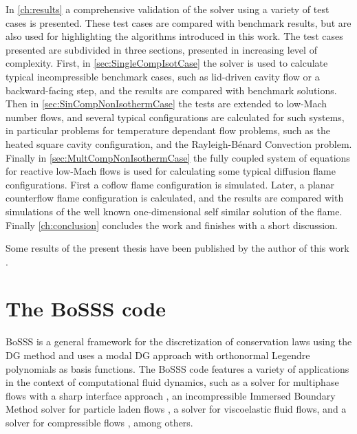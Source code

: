In \cref{ch:results} a comprehensive validation of the solver using a variety of test cases is presented. These test cases are compared with benchmark results, but are also used for highlighting the algorithms introduced in this work. The test cases presented are subdivided in three sections, presented in increasing level of complexity. First, in \cref{sec:SingleCompIsotCase} the solver is used to calculate typical incompressible benchmark cases, such as lid-driven cavity flow or a backward-facing step, and the results are compared with benchmark solutions. Then in \cref{sec:SinCompNonIsothermCase} the tests are extended to low-Mach number flows, and several typical configurations are calculated for such systems, in particular problems for temperature dependant flow problems, such as the heated square cavity configuration, and the Rayleigh-Bénard Convection problem.
Finally in \cref{sec:MultCompNonIsothermCase} the fully coupled system of equations for reactive low-Mach flows is used for calculating some typical diffusion flame configurations. First a coflow flame configuration is simulated. Later, a planar counterflow flame configuration is calculated, and the results are compared with simulations of the well known one-dimensional self similar solution of the flame. Finally \cref{ch:conclusion} concludes the work and finishes with a short discussion.

Some results of the present thesis have been published by the author of this work \parencite{gutierrez-jorqueraFullyCoupledHigh2022}.


\section{The BoSSS code}
BoSSS is a general framework for the discretization of conservation laws using the DG method and uses a modal DG approach with orthonormal Legendre polynomials as basis functions. The BoSSS code features a variety of applications in the context of computational fluid dynamics, such as a solver for multiphase flows with a sharp interface approach \parencite{kummerExtendedDiscontinuousGalerkin2017}, an incompressible Immersed Boundary Method solver for particle laden flows \parencite{krauseIncompressibleImmersedBoundary2017}, a solver for viscoelastic fluid flows\parencite{kikkerFullyCoupledHighorder}, and a solver for compressible flows \parencite{geisenhoferDiscontinuousGalerkinImmersed2019}, among others.


